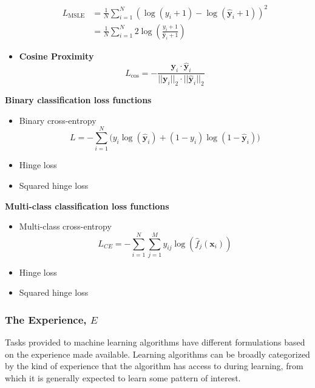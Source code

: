 \begin{itemize}
\begin{equation}
        \begin{aligned}
            L_\text{MSLE} &= \frac{1}{N}\sum_{i=1}^{N}(\log{(y_i+1)} - \log{(\hat{\mathbf{y}}_i+1)})^2 \\
            &= \frac{1}{N}\sum_{i=1}^{N}2\log(\frac{y_i+1}{\hat{\mathbf{y}}_i+1})
        \end{aligned}
    \end{equation}
    \item \textbf{Cosine Proximity}
    \begin{equation}
        L_\text{cos} = -\frac{\mathbf{y}_i\cdot{}\hat{\mathbf{y}}_i}{||\mathbf{y}_i||_2\cdot{}||\hat{\mathbf{y}}_i||_2}
    \end{equation}
\end{itemize}


\textbf{Binary classification loss functions}
\begin{itemize}
    \item Binary cross-entropy
    \begin{equation}
        L=-\sum_{i=1}^N\bigg(y_i\log(\hat{\mathbf{y}}_i)+(1-y_i)\log(1-\hat{\mathbf{y}}_i)\bigg)\label{eq:equation}
    \end{equation}
    \item Hinge loss
    \begin{equation}

    \end{equation}
    \item Squared hinge loss
\end{itemize}

\textbf{Multi-class classification loss functions}
\begin{itemize}
    \item Multi-class cross-entropy
    \begin{equation}
        L_{CE}=-\sum_{i=1}^N\sum_{j=1}^{M}y_{ij}\log(\hat{f}_j(\mathbf{x}_i))
    \end{equation}
    \item Hinge loss
    \item Squared hinge loss
\end{itemize}


\begin{itemize}
\end{itemize}

\subsubsection{The Experience, $E$\label{sec:ML-experience}}
Tasks provided to machine learning algorithms have different formulations based
on the experience made available. Learning algorithms can be broadly categorized
by the kind of experience that the algorithm has access to during learning, from
which it is generally expected to learn some pattern of interest.

